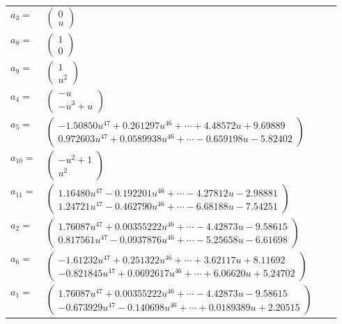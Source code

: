 \documentclass[1p]{elsarticle_modified}
\theoremstyle{definition}
\begin{document}
\begin{tabular}{m{7pt} m{180pt} m{7pt} m{180pt} }
\flushright $a_{3}=$&$\begin{pmatrix}0\\u\end{pmatrix}$ \\
\flushright $a_{8}=$&$\begin{pmatrix}1\\0\end{pmatrix}$ \\
\flushright $a_{9}=$&$\begin{pmatrix}1\\u^2\end{pmatrix}$ \\
\flushright $a_{4}=$&$\begin{pmatrix}- u\\- u^3+u\end{pmatrix}$ \\
\flushright $a_{5}=$&$\begin{pmatrix}-1.50850 u^{47}+0.261297 u^{46}+\cdots+4.48572 u+9.69889\\0.972603 u^{47}+0.0589938 u^{46}+\cdots-0.659198 u-5.82402\end{pmatrix}$ \\
\flushright $a_{10}=$&$\begin{pmatrix}- u^2+1\\u^2\end{pmatrix}$ \\
\flushright $a_{11}=$&$\begin{pmatrix}1.16480 u^{47}-0.192201 u^{46}+\cdots-4.27812 u-2.98881\\1.24721 u^{47}-0.462790 u^{46}+\cdots-6.68188 u-7.54251\end{pmatrix}$ \\
\flushright $a_{2}=$&$\begin{pmatrix}1.76087 u^{47}+0.00355222 u^{46}+\cdots-4.42873 u-9.58615\\0.817561 u^{47}-0.0937876 u^{46}+\cdots-5.25658 u-6.61698\end{pmatrix}$ \\
\flushright $a_{6}=$&$\begin{pmatrix}-1.61232 u^{47}+0.251322 u^{46}+\cdots+3.62117 u+8.11692\\-0.821845 u^{47}+0.0692617 u^{46}+\cdots+6.06620 u+5.24702\end{pmatrix}$ \\
\flushright $a_{1}=$&$\begin{pmatrix}1.76087 u^{47}+0.00355222 u^{46}+\cdots-4.42873 u-9.58615\\-0.673929 u^{47}-0.140698 u^{46}+\cdots+0.0189389 u+2.20515\end{pmatrix}$ \\

\end{tabular}
\end{document}
